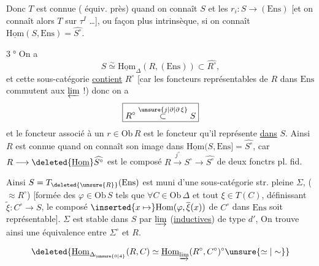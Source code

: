 Donc $T$ est connue ( équiv. près) quand on connaît $S$ et les $r_i:S\longrightarrow(\mathrm{Ens})$ [et on connaît alors  $T$ sur $\tau^{I}$ \ldots], ou  façon plus intrinsèque, si on connaît   $\underline{\mathrm{Hom}}(S,\mathrm{Ens})=\widehat{S^\circ}$.

\textcircled{3°} On a
\[
S\overset{\sim}{\simeq}\underline{\mathrm{Hom}}_{\Delta}(R,(\mathrm{Ens}))\subset\widehat{R^\circ},
\]
et cette sous-catégorie \uline{contient} $R^\circ$ [car les foncteurs  représentables  de $R$ dans $\mathrm{Ens}$ commutent aux $\varprojlim$ !) donc on a
\[
\boxed{R^\circ\overset{\unsure{j|\partial|\partial\,\xi}}{\subset}S}
\]
et le foncteur  associé à un $r\in\mathrm{Ob}\,R$ est le foncteur qu'il représente \uline{dans} $S$. Ainsi $R$ est connue quand on connaît son image  dans $\underline{\mathrm{Hom}}(S,\mathrm{Ens}]=\widehat{S^\circ}$, car $R\longrightarrow\deleted{\underline{\mathrm{Hom}}}\widehat{S^\circ}$ est le composé $R\xrightarrow{j^\circ}S^\circ\longrightarrow\widehat{S^\circ}$ de deux fonctrs pl. fid.

Ainsi $S=T_{\deleted{\unsure{R}}}(\mathrm{Ens})$ est muni d'une sous-catégorie str. pleine $\Sigma$, ($\approx R^\circ$) [formée des $\varphi\in\mathrm{Ob}\,S$ tels que  $\forall C\in\mathrm{Ob}\,\Delta$ et tout $\xi\in T(C)$, définissant $\widetilde\xi:C^\circ\longrightarrow S$,  le composé $\inserted{x\mapsto}\mathrm{Hom}(\varphi,\overline{\xi}(x))$ de $C^\circ$ dans $\mathrm{Ens}$ soit représentable].  $\Sigma$ est stable dans $S$ par  $\varinjlim$ (\uline{inductives}) de type $d'$,  On trouve ainsi une équivalence  entre $\Sigma^\circ$ et $R$.

\[
\deleted{\underline{\mathrm{Hom}}_{\Delta_{\unsure{0|4}}}(R,C)\simeq\underline{\mathrm{Hom}}_{\varinjlim}(R^\circ,C^\circ)^\circ\unsure{\simeq|\sim}}
\]
